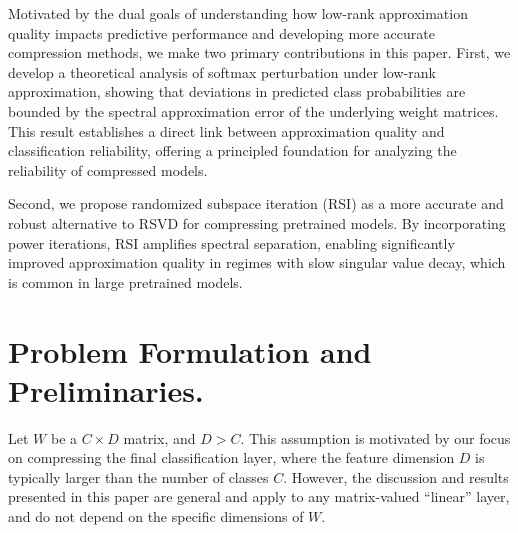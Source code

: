 \documentclass[twoside,leqno,onecolumn]{article}
\begin{document}
Motivated by the dual goals of understanding how low-rank approximation quality impacts predictive performance and developing more accurate compression methods, we make two primary contributions in this paper. First, we develop a theoretical analysis of softmax perturbation under low-rank approximation, showing that deviations in predicted class probabilities are bounded by the spectral approximation error of the underlying weight matrices. This result establishes a direct link between approximation quality and classification reliability, offering a principled foundation for analyzing the reliability of compressed models.


Second, we propose randomized subspace iteration (RSI) \cite{tropp2023randomized} as a more accurate and robust alternative to RSVD for compressing pretrained models. By incorporating power iterations, RSI amplifies spectral separation, enabling significantly improved approximation quality in regimes with slow singular value decay, which is common in large pretrained models.





\section{Problem Formulation and Preliminaries.}
Let $W$ be a $C \times D$ matrix, and $D > C$. This assumption is motivated by our focus on compressing the final classification layer, where the feature dimension $D$ is typically larger than the number of classes $C$. However, the discussion and results presented in this paper are general and apply to any matrix-valued ``linear'' layer, and do not depend on the specific dimensions of $W$. 
\end{document}
